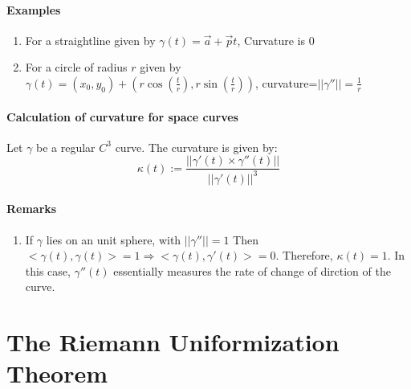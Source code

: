 \documentclass[oneside]{book}\twocolumn
\begin{document}
\subsection{Examples}
\begin{enumerate}
    \item For a straightline given by $\gamma(t)=\vec{a}+\vec{p}t$, Curvature is 0
    \item For a circle of radius $r$ given by $\gamma(t)=(x_0,y_0)+\left(r\cos\left(\frac{t}{r}\right),r\sin\left(\frac{t}{r}\right)\right)$, curvature=$||\gamma''||=\frac{1}{r}$
\end{enumerate}
\subsection{Calculation of curvature for space curves}
Let $\gamma$ be a regular $C^3$ curve. The curvature is given by:
$$\kappa(t):=\frac{||\gamma'(t)\times\gamma''(t)||}{||\gamma'(t)||^3}$$
\subsection{Remarks}
\begin{enumerate}
    \item If $\gamma$ lies on an unit sphere, with $||\gamma''||=1$ Then $<\gamma(t),\gamma(t)>=1\Rightarrow <\gamma(t),\gamma'(t)>=0$. Therefore, $\kappa(t)=1$. In this case, $\gamma''(t)$ essentially measures the rate of change of dirction of the curve.  
\end{enumerate}
























\part{The Riemann Uniformization Theorem}
\end{document}
